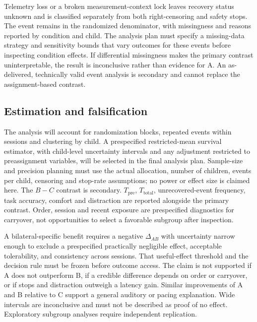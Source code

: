 Telemetry loss or a broken measurement-context lock leaves recovery status unknown and is classified separately from both right-censoring and safety stops. The event remains in the randomized denominator, with missingness and reasons reported by condition and child. The analysis plan must specify a missing-data strategy and sensitivity bounds that vary outcomes for these events before inspecting condition effects. If differential missingness makes the primary contrast uninterpretable, the result is inconclusive rather than evidence for A. An as-delivered, technically valid event analysis is secondary and cannot replace the assignment-based contrast.

\subsection{Estimation and falsification}

The analysis will account for randomization blocks, repeated events within sessions and clustering by child. A prespecified restricted-mean survival estimator, with child-level uncertainty intervals and any adjustment restricted to preassignment variables, will be selected in the final analysis plan. Sample-size and precision planning must use the actual allocation, number of children, events per child, censoring and stop-rate assumptions; no power or effect size is claimed here. The \(B-C\) contrast is secondary. \(T_{\mathrm{pre}}\), \(T_{\mathrm{total}}\), unrecovered-event frequency, task accuracy, comfort and distraction are reported alongside the primary contrast. Order, session and recent exposure are prespecified diagnostics for carryover, not opportunities to select a favorable subgroup after inspection.

A bilateral-specific benefit requires a negative \(\Delta_{AB}\) with uncertainty narrow enough to exclude a prespecified practically negligible effect, acceptable tolerability, and consistency across sessions. That useful-effect threshold and the decision rule must be frozen before outcome access. The claim is not supported if A does not outperform B, if a credible difference depends on order or carryover, or if stops and distraction outweigh a latency gain. Similar improvements of A and B relative to C support a general auditory or pacing explanation. Wide intervals are inconclusive and must not be described as proof of no effect. Exploratory subgroup analyses require independent replication.
